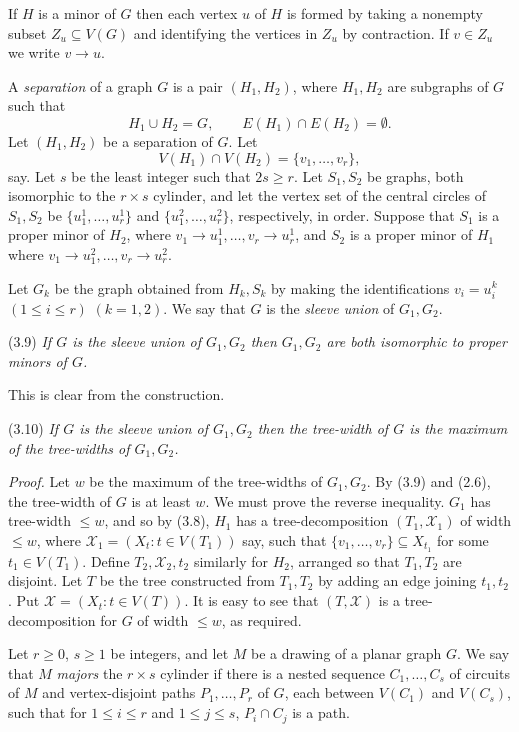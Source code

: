 If $H$ is a minor of $G$ then each vertex $u$ of $H$ is formed by taking a nonempty subset $Z_u \subseteq V(G)$ and identifying the vertices in $Z_u$ by contraction. If $v \in Z_u$ we write $v \to u$.

A \textit{separation} of a graph $G$ is a pair $(H_1, H_2)$, where $H_1, H_2$ are subgraphs of $G$ such that
\begin{equation*}
H_1 \cup H_2 = G, \qquad E(H_1) \cap E(H_2) = \emptyset.
\end{equation*}
Let $(H_1, H_2)$ be a separation of $G$. Let
\begin{equation*}
V(H_1) \cap V(H_2) = \{v_1, \dots, v_r\},
\end{equation*}
say. Let $s$ be the least  integer such that $2s \ge r$. Let $S_1, S_2$ be graphs, both isomorphic to the $r \times s$ cylinder, and let the vertex set of the central circles of $S_1, S_2$ be $\{u_1^1, \dots, u_r^1\}$ and $\{u_1^2, \dots, u_r^2\}$, respectively, in order. Suppose that $S_1$ is a proper minor of $H_2$, where $v_1 \to u_1^1, \dots, v_r \to u_r^1$, and $S_2$ is a proper minor of $H_1$ where $v_1 \to u_1^2, \dots, v_r \to u_r^2$.

Let $G_k$ be the graph obtained from $H_k, S_k$ by making the identifications $v_i = u_i^k$ $(1 \le i \le r)$ $(k = 1, 2)$. We say that $G$ is the \textit{sleeve union} of $G_1, G_2$.

\stmt
(3.9) \textit{If $G$ is the sleeve union of $G_1, G_2$ then $G_1, G_2$ are both isomorphic to proper minors of $G$.}

This is clear from the construction.

\stmt
(3.10) \textit{If $G$ is the sleeve union of $G_1, G_2$ then the tree-width of $G$ is the maximum of the tree-widths of $G_1, G_2$.}

\textit{Proof.} Let $w$ be the maximum of the tree-widths of $G_1, G_2$. By (3.9) and (2.6), the tree-width of $G$ is at least $w$. We must prove the reverse inequality. $G_1$ has tree-width $\le w$, and so by (3.8), $H_1$ has a tree-decomposition $(T_1, \mathcal{X}_1)$ of width $\le w$, where $\mathcal{X}_1 = (X_t : t \in V(T_1))$ say, such that $\{v_1, \dots, v_r\} \subseteq X_{t_1}$ for some $t_1 \in V(T_1)$. Define $T_2, \mathcal{X}_2, t_2$ similarly for $H_2$, arranged so that $T_1, T_2$ are disjoint. Let $T$ be the tree constructed from $T_1, T_2$ by adding an edge joining $t_1, t_2$. Put $\mathcal{X} = (X_t : t \in V(T))$. It is easy to see that $(T, \mathcal{X})$ is a tree-decomposition for $G$ of width $\le w$, as required.


Let $r \ge 0$, $s \ge 1$ be integers, and let $M$ be a drawing of a planar graph $G$. We say that $M$ \textit{majors} the $r \times s$ cylinder if there is a nested sequence $C_1, \dots, C_s$ of circuits of $M$ and vertex-disjoint paths $P_1, \dots, P_r$ of $G$, each between $V(C_1)$ and $V(C_s)$, such that for $1 \le i \le r$ and $1 \le j \le s$, $P_i \cap C_j$ is a path.
